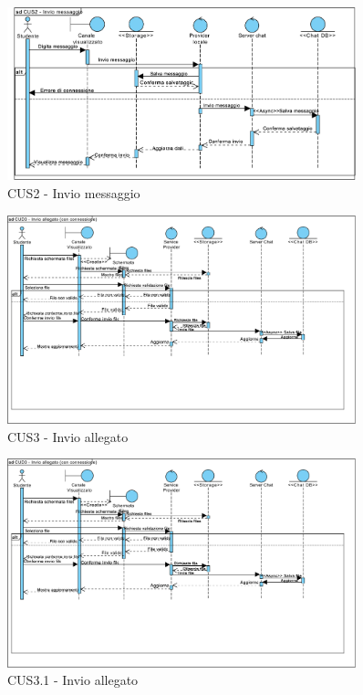 \begin{figure}
	\centering
	\includegraphics[width=0.9\textwidth]{imgs/gruppo6/sequence/CUS2_invio_messaggio.pdf}
	\caption{CUS2 - Invio messaggio}
	\label{fig:seq-cus2}
\end{figure}

\begin{figure}
	\centering
	\includegraphics[width=0.9\textwidth]{imgs/gruppo6/sequence/CUS3_invio_allegato.pdf}
	\caption{CUS3 - Invio allegato}
	\label{fig:seq-cus3}
\end{figure}

\begin{figure}
	\centering
	\includegraphics[width=0.9\textwidth]{imgs/gruppo6/sequence/CUS3_invio_allegato.pdf}
	\caption{CUS3.1 - Invio allegato}
	\label{fig:seq-cus3mod}
\end{figure}

